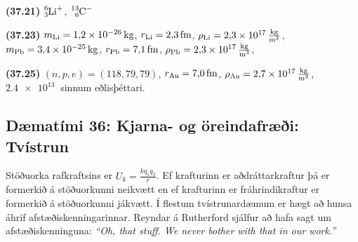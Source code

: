 \begin{tcolorbox}
\begin{enumerate*}[label = ]
  \item \textbf{(37.21)} $\ce{^{6}_{3}Li^{+}}$, $\ce{^{13}_{6}C^{-}}$
  \item \textbf{(37.23)} $m_{{\ce{Li}}} = \SI{1.2e-26}{kg}$, $r_{{\ce{Li}}} = \SI{2.3}{fm}$, $\rho_{{\ce{Li}}} = \SI{2.3e17}{\frac{kg}{m^3}}$, $m_{{\ce{Pb}}} = \SI{3.4e-25}{kg}$, $r_{{\ce{Pb}}} = \SI{7.1}{fm}$, $\rho_{{\ce{Pb}}} = \SI{2.3e17}{\frac{kg}{m^3}}$,
  \item \textbf{(37.25)} $(n,p,e) = (118,79,79)$, $r_{\ce{Au}} = \SI{7.0}{fm}$, $\rho_{\ce{Au}} = \SI{2.7e17}{\frac{kg}{m^3}}$, $\SI{2.4e13}{}$ sinnum eðlisþéttari.
\end{enumerate*}
\end{tcolorbox}

\newpage

\subsection*{Dæmatími 36: Kjarna- og öreindafræði: Tvístrun}

\begin{tcolorbox}
Stöðuorka rafkraftsins er $U_k = \frac{kq_1 q_2}{r}$. Ef krafturinn er aðdráttarkraftur þá er formerkið á stöðuorkunni neikvætt en ef krafturinn er fráhrindikraftur er formerkið á stöðuorkunni jákvætt. Í flestum tvístrunardæmum er hægt að hunsa áhrif afstæðiskenningarinnar. Reyndar á Rutherford sjálfur að hafa sagt um afstæðiskenninguna: \textit{``Oh, that stuff. We never bother with that in our work.''}
\end{tcolorbox}

